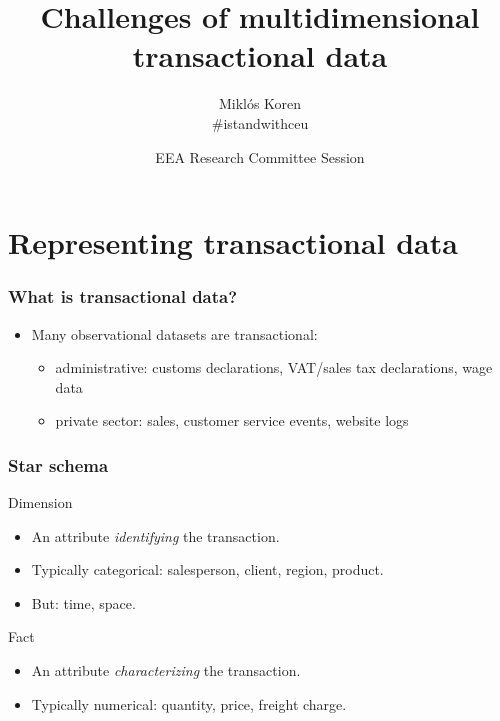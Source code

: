 \documentclass[compress,mathserif]{beamer}
\title{Challenges of multidimensional transactional data}
\author{Miklós Koren\\
\#istandwithceu}
\date %
{EEA Research Committee Session}
\begin{document}
\begin{frame}[plain]
  \titlepage
    \addtocounter{framenumber}{-1}
\end{frame}






\section{Representing transactional data}\hypertarget{Representing transactional data}{}
\begin{frame}\frametitle{What is transactional data?}\hypertarget{What is transactional data?}{}
\begin{itemize}
\item Many observational datasets are transactional: 
\begin{itemize}
\item administrative: customs declarations, VAT/sales tax declarations, wage data

\item private sector: sales, customer service events, website logs


\end{itemize}

\end{itemize}
\end{frame}



\begin{frame}\frametitle{Star schema}\hypertarget{Star schema}{}
\begin{block}{Dimension}\hypertarget{Dimension}{}
\begin{itemize}
\item An attribute \emph{identifying} the transaction. 

\item Typically categorical: salesperson, client, region, product.

\item But: time, space.


\end{itemize}
\end{block}
\begin{block}{Fact}\hypertarget{Fact}{}
\begin{itemize}
\item An attribute \emph{characterizing} the transaction. 

\item Typically numerical: quantity, price, freight charge.


\end{itemize}
\end{block}
\end{frame}
\end{document}
